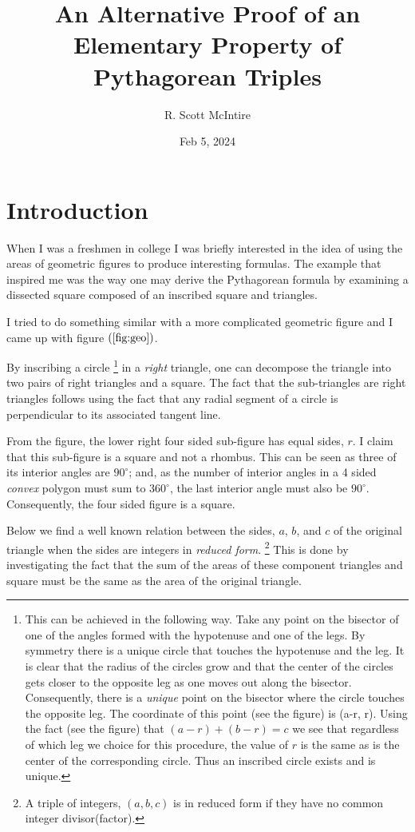 \documentclass[12pt]{article}
\title{An Alternative Proof of an Elementary Property of Pythagorean Triples}
\author{R. Scott McIntire}
\date{Feb 5, 2024}
\begin{document}
\maketitle

\section{Introduction}
When I was a freshmen in college I was briefly interested in the idea of 
using the areas of geometric figures to
produce interesting formulas. The example that inspired me was the way one 
may derive the Pythagorean formula
by examining a dissected square composed of 
an inscribed square and triangles. 

I tried to do something similar with a more complicated geometric figure and 
I came up with figure $(\ref{fig:geo})$.

By inscribing a circle%
\footnote{This can be achieved in the following way.
Take any point on the bisector of one of the angles formed
with the hypotenuse and one of the legs. By symmetry there is a unique circle
that touches the hypotenuse and the leg. It is clear that the radius 
of the circles grow and that the center of the circles gets closer to the
opposite leg as one moves out along the bisector.
Consequently, there is
a {\em unique\/} point on the bisector where the circle touches the opposite leg.
The coordinate of this point (see the figure) is (a-r, r). Using the fact 
(see the figure) that $(a-r) + (b-r) = c$ we see that regardless of 
which leg we choice for this procedure, the value of $r$ is the same as is
the center of the corresponding circle. Thus an inscribed circle exists
and is unique.}
in a {\em right\/} triangle, one can decompose the triangle 
into two pairs of right triangles and a square. The fact that the sub-triangles
are right triangles follows using the fact that 
any radial segment of a circle is perpendicular to its
associated tangent line. 

From the figure, the lower right four sided sub-figure has equal sides, $r$.
I claim that this sub-figure is a square and not a rhombus.
This can be seen as three of its interior angles are 
$90^\circ$; and, as the number of interior angles in a 4 sided {\em convex\/} 
polygon must sum to $360^\circ$, the last interior angle must also be $90^\circ$.
Consequently, the four sided figure is a square.

Below we find a well known relation between the sides, $a$, $b$, and $c$ of the
original triangle when the sides are integers in {\em reduced form\/}.%
\footnote{A triple of integers, $(a, b, c)$ is in reduced form if 
they have no common integer divisor(factor).}
This is done by investigating the fact that the sum of the areas
of these component triangles 
and square must be the same as the area of the original triangle. 
\end{document}
